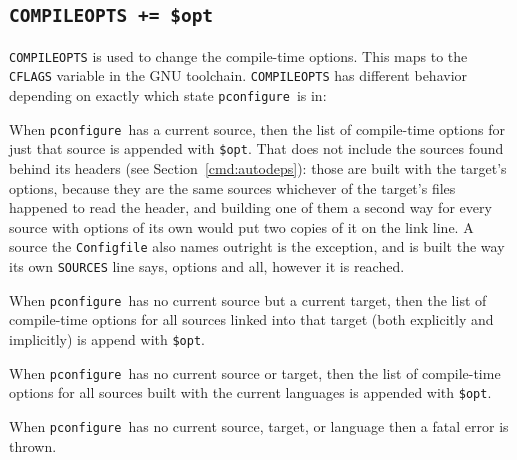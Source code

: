 \documentclass{article}
\newcommand{\pconfigure}{\texttt{pconfigure}}
\begin{document}
\subsection{\texttt{COMPILEOPTS += \$opt} \label{cmd:compileopts}}

\texttt{COMPILEOPTS} is used to change the compile-time options.  This
maps to the \texttt{CFLAGS} variable in the GNU toolchain.
\texttt{COMPILEOPTS} has different behavior depending on exactly which
state \pconfigure\ is in:

When \pconfigure\ has a current source, then the list of compile-time
options for just that source is appended with \texttt{\$opt}.
That does not include the sources found behind its headers (see
Section~\ref{cmd:autodeps}): those are built with the target's
options, because they are the same sources whichever of the target's
files happened to read the header, and building one of them a second
way for every source with options of its own would put two copies of
it on the link line.  A source the \texttt{Configfile} also names
outright is the exception, and is built the way its own
\texttt{SOURCES} line says, options and all, however it is reached.

When \pconfigure\ has no current source but a current target, then the
list of compile-time options for all sources linked into that target
(both explicitly and implicitly) is append with \texttt{\$opt}.

When \pconfigure\ has no current source or target, then the list of
compile-time options for all sources built with the current languages
is appended with \texttt{\$opt}.

When \pconfigure\ has no current source, target, or language then a
fatal error is thrown.
\end{document}
